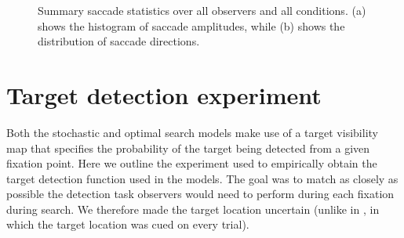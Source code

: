 \documentclass[preprint, authoryear]{elsarticle} %
\begin{document}
\begin{figure}
	\centering
	\caption{Summary saccade statistics over all observers and all conditions. (a) shows the histogram of saccade amplitudes, while (b) shows the distribution of saccade directions. }
	\label{fig:saccsummclarke2009}
\end{figure}

\section{Target detection experiment}
\label{surfacesearchdetectprob}

Both the stochastic and optimal search models make use of a target visibility map that specifies the probability of the target being detected from a given fixation point.  Here we outline the experiment used to empirically obtain the target detection function used in the models. The goal was to match as closely as possible the detection task observers would need to perform during each fixation during search. We therefore made the target location uncertain (unlike in \cite{najemnik-geisler2005,najemnik-geisler2008}, in which the target location was cued on every trial).
\end{document}
